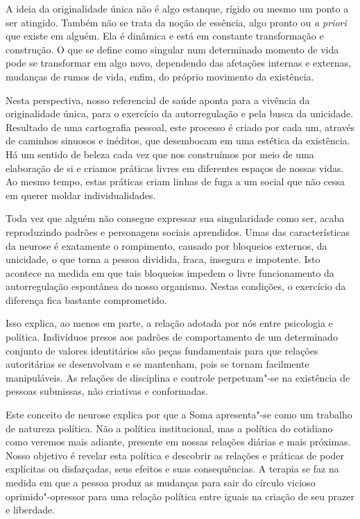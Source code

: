 A ideia da originalidade única não é algo estanque, rígido ou mesmo um
ponto a ser atingido. Também não se trata da noção de essência, algo
pronto ou \emph{a priori} que existe em alguém. Ela é dinâmica e está em
constante transformação e construção. O que se define como singular num
determinado momento de vida pode se transformar em algo novo,
dependendo das afetações internas e externas, mudanças de rumos de vida,
enfim, do próprio movimento da existência.

Nesta perspectiva, nosso referencial de saúde aponta para a vivência da
originalidade única, para o exercício da autorregulação e pela busca da
unicidade. Resultado de uma cartografia pessoal, este processo é criado
por cada um, através de caminhos sinuosos e inéditos, que desembocam em
uma estética da existência. Há um sentido de beleza cada vez que nos
construímos por meio de uma elaboração de si e criamos práticas livres
em diferentes espaços de nossas vidas. Ao mesmo tempo, estas práticas
criam linhas de fuga a um social que não cessa em querer moldar
individualidades.

Toda vez que alguém não consegue expressar sua singularidade como ser,
acaba reproduzindo padrões e personagens sociais aprendidos. Umas das
características da neurose é exatamente o rompimento, causado por
bloqueios externos, da unicidade, o que torna a pessoa dividida, fraca,
insegura e impotente. Isto acontece na medida em que tais bloqueios
impedem o livre funcionamento da autorregulação espontânea do nosso
organismo. Nestas condições, o exercício da diferença fica bastante
comprometido.

Isso explica, ao menos em parte, a relação adotada por nós entre
psicologia e política. Indivíduos presos aos padrões de comportamento de
um determinado conjunto de valores identitários são peças fundamentais
para que relações autoritárias se desenvolvam e se mantenham, pois se
tornam facilmente manipuláveis. As relações de disciplina e controle
perpetuam"-se na existência de pessoas submissas, não criativas e
conformadas.

Este conceito de neurose explica por que a Soma apresenta"-se como um
trabalho de natureza política. Não a política institucional, mas a
política do cotidiano como veremos mais adiante, presente em nossas
relações diárias e mais próximas. Nosso objetivo é revelar esta política
e descobrir as relações e práticas de poder explícitas ou disfarçadas,
seus efeitos e suas consequências. A terapia se faz na medida em que a
pessoa produz as mudanças para sair do círculo vicioso oprimido"-opressor
para uma relação política entre iguais na criação de seu prazer e
liberdade.

